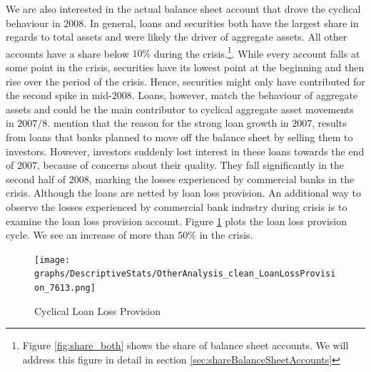 \documentclass[12pt, a4paper]{article} %
\begin{document}

We are also interested in the actual balance sheet account that drove the cyclical behaviour in $2008$. In general, loans and securities both have the largest share in regards to total assets and were likely the driver of aggregate assets. All other accounts have a share below $10\%$ during the crisis.\footnote{Figure \ref{fig:share_both} shows the share of balance sheet accounts. We will address this figure in detail in section \ref{sec:shareBalanceSheetAccounts}}. While every account falls at some point in the crisis, securities have its lowest point at the beginning and then rise over the period of the crisis. Hence, securities might only have contributed for the second spike in mid-$2008$. Loans, however, match the behaviour of aggregate assets and could be the main contributor to cyclical aggregate asset movements in $2007/8$. \citet{bassett2008profits} mention that the reason for the strong loan growth in $2007$, results from loans that banks planned to move off the balance sheet by selling them to investors. However, investors suddenly lost interest in these loans towards the end of $2007$, because of concerns about their quality. 
They fall significantly in the second half of $2008$, marking the losses experienced by commercial banks in the crisis.
Although the loans are netted by loan loss provision. An additional way to observe the losses experienced by commercial bank industry during crisis is to examine the loan loss provision account. Figure \ref{fig:loan_loss_provision} plots the loan loss provision cycle. We see an increase of more than $50\%$ in the crisis.

\begin{figure}[H]
\begin{minipage}{\textwidth}
\texttt{[image: graphs/DescriptiveStats/OtherAnalysis\_clean\_LoanLossProvision\_7613.png]}
\caption[1]{Cyclical Loan Loss Provision}
\label{fig:loan_loss_provision}
\end{minipage}
\end{figure}
\end{document}
